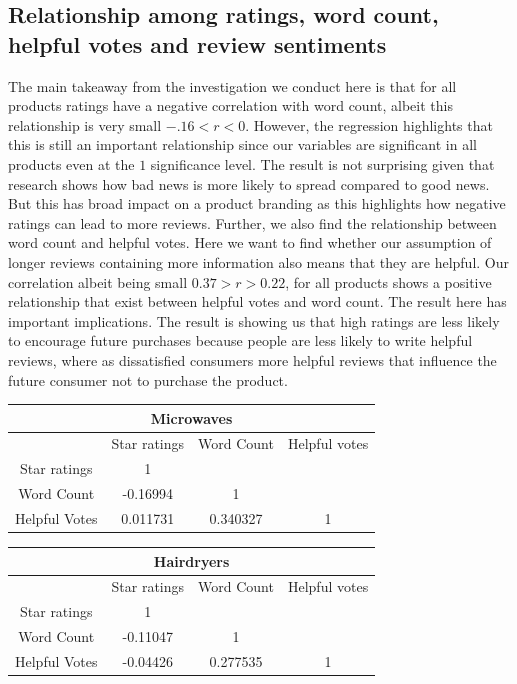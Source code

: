 \documentclass[reqno]{article}
\theoremstyle{definition}
\theoremstyle{definition}
\theoremstyle{remark}
\begin{document}
\subsection{Relationship among ratings, word count, helpful votes and review sentiments}
The main takeaway from the investigation we conduct here is that for all products ratings have a negative  correlation with word count, albeit this relationship is very small $-.16<r<0$. However, the regression highlights that this is still an important relationship  since our variables are significant in all products even at the $1$ significance level. The result is not surprising given that research shows how bad news is more likely to spread compared to good news\cite{2}. But this has broad impact on a product branding as this highlights how negative ratings can lead to more reviews. Further, we also find the relationship between word count and helpful votes. Here we want to find whether our assumption of longer reviews containing more information also means that they are helpful. Our correlation albeit being small $0.37>r>0.22$, for all products shows a positive relationship that exist between helpful votes and word count. The result here has important implications. The result is showing us that high ratings are less likely to encourage future purchases because people are less likely to write helpful reviews, where as dissatisfied consumers more helpful reviews that influence the future consumer not to purchase the product.
\begin{center}
\begin{tabular}{|c|c|c|c|}
 \hline
 \multicolumn{4}{|c|}{Microwaves}\\
 \hline
 & Star ratings & Word Count & Helpful votes\\
 \hline
 Star ratings & 1 & & \\
 Word Count & -0.16994 & 1 & \\
 Helpful Votes & 0.011731 & 0.340327 & 1\\
 \hline
\end{tabular}
\end{center}
\begin{center}
\begin{tabular}{|c|c|c|c|}
\hline
\multicolumn{4}{|c|}{Hairdryers}\\
\hline
& Star ratings & Word Count & Helpful votes\\
\hline
Star ratings & 1 & & \\
Word Count & -0.11047 & 1 & \\
Helpful Votes & -0.04426 & 0.277535 & 1\\
\hline
\end{tabular}
\end{center}
\end{document}
